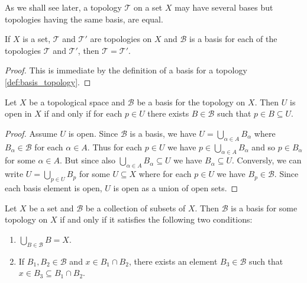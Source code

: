 As we shall see later, a topology $\mathcal{T}$ on a set $X$ may have several bases but topologies having the same basis, are equal.

\begin{corollary}	
	If $X$ is a set, $\mathcal{T}$ and $\mathcal{T}'$ are topologies on $X$ and $\mathcal{B}$ is a basis for each  of the topologies $\mathcal{T}$ and $\mathcal{T}'$, then $\mathcal{T} = \mathcal{T}'$.
	\label{cor:topology_unique}
\end{corollary}

\begin{proof}
	This is immediate by the definition of a basis for a topology \ref{def:basis_topology}.
\end{proof}

\begin{proposition}
	Let $X$ be a topological space and $\mathcal{B}$ be a basis for the topology on $X$. Then $U$ is open in $X$ if and only if for each $p \in U$ there exists $B \in \mathcal{B}$ such that $p \in B \subseteq U$.
	\label{prop:basis_criterion}
\end{proposition}

\begin{proof}
	Assume $U$ is open. Since $\mathcal{B}$ is a basis, we have $U = \bigcup_{\alpha \in A} B_\alpha$ where $B_\alpha \in \mathcal{B}$ for each $\alpha \in A$. Thus for each $p \in U$ we have $p \in \bigcup_{\alpha \in A} B_\alpha$ and so $p \in B_\alpha$ for some $\alpha \in A$. But since also $\bigcup_{\alpha \in A} B_\alpha \subseteq U$ we have $B_\alpha \subseteq U$. Conversly, we can write $U = \bigcup_{p \in U} B_p$ for some $U \subseteq X$ where for each $p \in U$ we have $B_p \in \mathcal{B}$. Since each basis element is open, $U$ is open as a union of open sets.
\end{proof}

\begin{definition}
	Let $X$ be a set and $\mathcal{B}$ be a collection of subsets of $X$. Then $\mathcal{B}$ is a basis for some topology on $X$ if and only if it satisfies the following two conditions:

	\begin{enumerate}
		\item $\bigcup_{B \in \mathcal{B}}B = X$.
		\item If $B_1,B_2 \in \mathcal{B}$ and $x \in B_1 \cap B_2$, there exists an element $B_3 \in \mathcal{B}$ such that $x \in B_3 \subseteq B_1\cap B_2$.
	\end{enumerate}
\end{definition}

